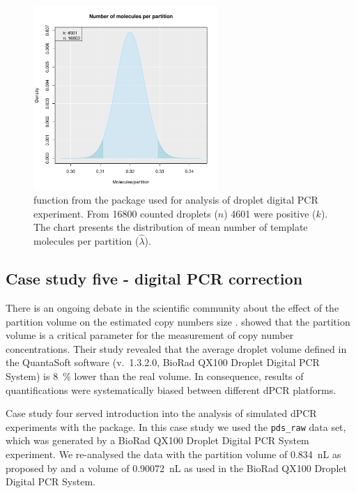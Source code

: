 \begin{figure}[htbp]
  \centering
  \includegraphics[clip=true, width=7cm]{figures/dpcR.pdf}
  \caption{ function from the  package used 
for analysis of droplet digital PCR experiment. From 16800 counted droplets 
($n$) 4601 were positive ($k$). The chart presents the distribution of mean 
number of 
template molecules per partition ($\hat \lambda$). 
}
  \label{figure:dpcR}
\end{figure}

\subsection{Case study five - digital PCR correction}

There is an ongoing debate in the scientific community about the effect of the 
partition volume on the estimated copy numbers size 
\citep{huggett_clinchem_2014, corbisier_2015, majumdar_2015}. 
\citet{corbisier_2015} showed that the partition volume is a critical parameter 
for the measurement of copy number concentrations. Their study revealed that the 
average droplet volume defined in the QuantaSoft software (v.~1.3.2.0, BioRad 
QX100 Droplet Digital PCR System) is 8~\% lower than the real volume. In 
consequence, results of quantifications were systematically biased between 
different dPCR platforms. 

Case study four served introduction into the analysis of simulated dPCR experiments with 
the  package. In this case study we used the \texttt{pds\_raw} 
data set, which was generated by a BioRad QX100 Droplet Digital PCR System 
experiment. We re-analysed the data with the partition volume of 0.834~nL as 
proposed by \citet{corbisier_2015} and a volume of 0.90072~nL as used in the 
BioRad QX100 Droplet Digital PCR System.

